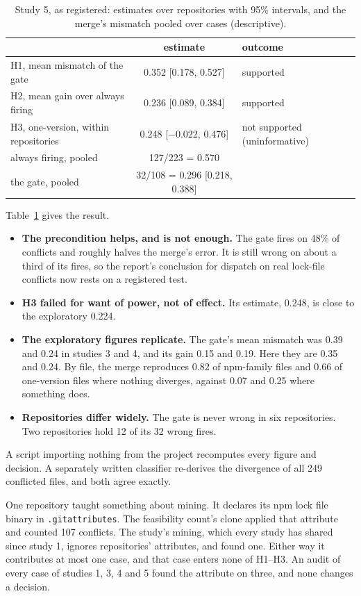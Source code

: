 \documentclass[11pt]{article}
\newcommand{\code}[1]{\texttt{#1}}
\begin{document}
\begin{table}[h]
\centering
\caption{Study 5, as registered: estimates over repositories with 95\% intervals, and the
merge's mismatch pooled over cases (descriptive).}
\label{tab:study5}
\small
\begin{tabular}{lcl}
\toprule
& estimate & outcome \\
\midrule
H1, mean mismatch of the gate & 0.352 [0.178, 0.527] & supported \\
H2, mean gain over always firing & 0.236 [0.089, 0.384] & supported \\
H3, one-version, within repositories & 0.248 [$-$0.022, 0.476] & not supported (uninformative) \\
\midrule
always firing, pooled & 127/223 = 0.570 & \\
the gate, pooled & 32/108 = 0.296 [0.218, 0.388] & \\
\bottomrule
\end{tabular}
\end{table}

Table~\ref{tab:study5} gives the result.
\begin{itemize}
  \item \textbf{The precondition helps, and is not enough.} The gate fires on 48\% of conflicts
  and roughly halves the merge's error. It is still wrong on about a third of its fires, so the
  report's conclusion for dispatch on real lock-file conflicts now rests on a registered test.
  \item \textbf{H3 failed for want of power, not of effect.} Its estimate, 0.248, is close to
  the exploratory 0.224.
  \item \textbf{The exploratory figures replicate.} The gate's mean mismatch was 0.39 and 0.24 in
  studies 3 and 4, and its gain 0.15 and 0.19. Here they are 0.35 and 0.24. By file, the merge
  reproduces 0.82 of npm-family files and 0.66 of one-version files where nothing diverges,
  against 0.07 and 0.25 where something does.
  \item \textbf{Repositories differ widely.} The gate is never wrong in six repositories. Two
  repositories hold 12 of its 32 wrong fires.
\end{itemize}

A script importing nothing from the project recomputes every figure and decision. A separately
written classifier re-derives the divergence of all 249 conflicted files, and both agree
exactly.

One repository taught something about mining. It declares its npm lock file binary in
\code{.gitattributes}. The feasibility count's clone applied that attribute and
counted 107 conflicts. The study's mining, which every study has shared since study 1, ignores
repositories' attributes, and found one. Either way it contributes at most one case, and that
case enters none of H1--H3. An audit of every case of studies 1, 3, 4 and 5 found the attribute
on three, and none changes a decision.
\end{document}

